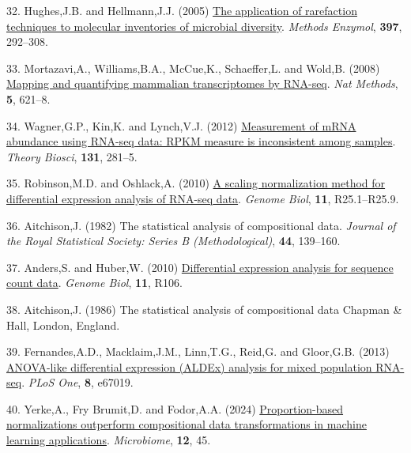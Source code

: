 \documentclass[
]{article}
\newlength{\cslhangindent}
\newenvironment{CSLReferences}[2] %
 {\begin{list}{}{%
  \setlength{\itemindent}{0pt}
  \setlength{\leftmargin}{0pt}
  \setlength{\parsep}{0pt}
  \ifodd #1
   \setlength{\leftmargin}{\cslhangindent}
   \setlength{\itemindent}{-1\cslhangindent}
  \fi
  \setlength{\itemsep}{#2\baselineskip}}}
 {\end{list}}
\begin{document}
\begin{CSLReferences}{1}{1}
32. Hughes,J.B. and Hellmann,J.J. (2005)
\href{https://doi.org/10.1016/S0076-6879(05)97017-1}{The application of
rarefaction techniques to molecular inventories of microbial diversity}.
\emph{Methods Enzymol}, \textbf{397}, 292--308.

33. Mortazavi,A., Williams,B.A., McCue,K., Schaeffer,L. and Wold,B.
(2008) \href{https://doi.org/10.1038/nmeth.1226}{Mapping and quantifying
mammalian transcriptomes by {RNA-seq}}. \emph{Nat Methods}, \textbf{5},
621--8.

34. Wagner,G.P., Kin,K. and Lynch,V.J. (2012)
\href{https://doi.org/10.1007/s12064-012-0162-3}{Measurement of mRNA
abundance using RNA-seq data: RPKM measure is inconsistent among
samples}. \emph{Theory Biosci}, \textbf{131}, 281--5.

35. Robinson,M.D. and Oshlack,A. (2010)
\href{https://doi.org/10.1186/gb-2010-11-3-r25}{A scaling normalization
method for differential expression analysis of {RNA-seq} data}.
\emph{Genome Biol}, \textbf{11}, R25.1--R25.9.

36. Aitchison,J. (1982) The statistical analysis of compositional data.
\emph{Journal of the Royal Statistical Society: Series B
(Methodological)}, \textbf{44}, 139--160.

37. Anders,S. and Huber,W. (2010)
\href{https://doi.org/10.1186/gb-2010-11-10-r106}{Differential
expression analysis for sequence count data}. \emph{Genome Biol},
\textbf{11}, R106.

38. Aitchison,J. (1986) The statistical analysis of compositional data
Chapman \& Hall, London, England.

39. Fernandes,A.D., Macklaim,J.M., Linn,T.G., Reid,G. and Gloor,G.B.
(2013) \href{https://doi.org/10.1371/journal.pone.0067019}{ANOVA-like
differential expression (ALDEx) analysis for mixed population RNA-seq}.
\emph{PLoS One}, \textbf{8}, e67019.

40. Yerke,A., Fry Brumit,D. and Fodor,A.A. (2024)
\href{https://doi.org/10.1186/s40168-023-01747-z}{Proportion-based
normalizations outperform compositional data transformations in machine
learning applications}. \emph{Microbiome}, \textbf{12}, 45.


\end{CSLReferences}
\end{document}
